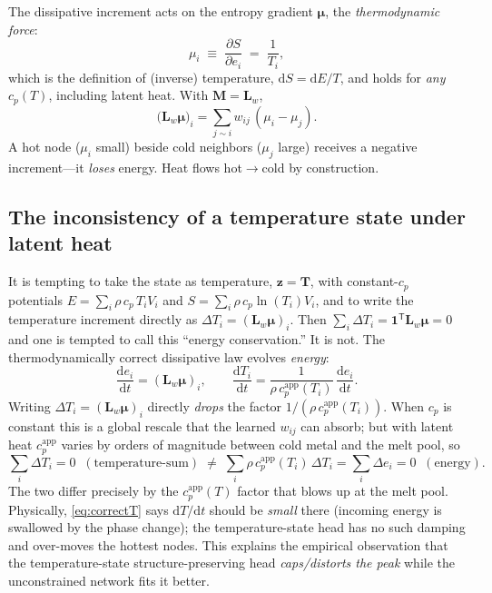 \documentclass[11pt]{article}
\newcommand{\dd}{\mathrm{d}}
\newcommand{\T}{\mathsf{T}}                 %
\newcommand{\Lw}{\bm{L}_{\!w}}
\newcommand{\bmu}{\bm{\mu}}
\newcommand{\cpapp}{c_p^{\mathrm{app}}}
\theoremstyle{definition}
\begin{document}
The dissipative increment acts on the entropy gradient $\bmu$, the
\emph{thermodynamic force}:
\begin{equation}
  \mu_i \;\equiv\; \frac{\partial S}{\partial e_i} \;=\; \frac{1}{T_i},
  \label{eq:mu}
\end{equation}
which is the definition of (inverse) temperature, $\dd S=\dd E/T$, and holds for
\emph{any} $c_p(T)$, including latent heat. With $\bm M=\Lw$,
\begin{equation}
  \big(\Lw\bmu\big)_i = \sum_{j\sim i} w_{ij}\,(\mu_i-\mu_j).
  \label{eq:dissipation}
\end{equation}
A hot node ($\mu_i$ small) beside cold neighbors ($\mu_j$ large) receives a negative
increment---it \emph{loses} energy. Heat flows hot$\to$cold by construction.

\subsection{The inconsistency of a temperature state under latent heat}

It is tempting to take the state as temperature, $\bm z=\bm T$, with constant-$c_p$
potentials $E=\sum_i\rho\,c_p\,T_iV_i$ and $S=\sum_i\rho\,c_p\ln(T_i)V_i$, and to write
the temperature increment directly as $\Delta T_i=(\Lw\bmu)_i$. Then $\sum_i\Delta
T_i=\bm1^\T\Lw\bmu=0$ and one is tempted to call this ``energy conservation.'' It is
not. The thermodynamically correct dissipative law evolves \emph{energy}:
\begin{equation}
  \frac{\dd e_i}{\dd t}=(\Lw\bmu)_i,
  \qquad
  \frac{\dd T_i}{\dd t}=\frac{1}{\rho\,\cpapp(T_i)}\,\frac{\dd e_i}{\dd t}.
  \label{eq:correctT}
\end{equation}
Writing $\Delta T_i=(\Lw\bmu)_i$ directly \emph{drops} the factor
$1/(\rho\,\cpapp(T_i))$. When $c_p$ is constant this is a global rescale that the
learned $w_{ij}$ can absorb; but with latent heat $\cpapp$ varies by orders of
magnitude between cold metal and the melt pool, so
\begin{equation}
  \sum_i \Delta T_i = 0
  \;\;(\text{temperature-sum})
  \;\neq\;
  \sum_i \rho\,\cpapp(T_i)\,\Delta T_i = \sum_i \Delta e_i = 0
  \;\;(\text{energy}).
  \label{eq:wrongcons}
\end{equation}
The two differ precisely by the $\cpapp(T)$ factor that blows up at the melt pool.
Physically, \cref{eq:correctT} says $\dd T/\dd t$ should be \emph{small} there (incoming
energy is swallowed by the phase change); the temperature-state head has no such damping
and over-moves the hottest nodes. This explains the empirical observation that the
temperature-state structure-preserving head \emph{caps/distorts the peak} while the
unconstrained network fits it better.
\end{document}
